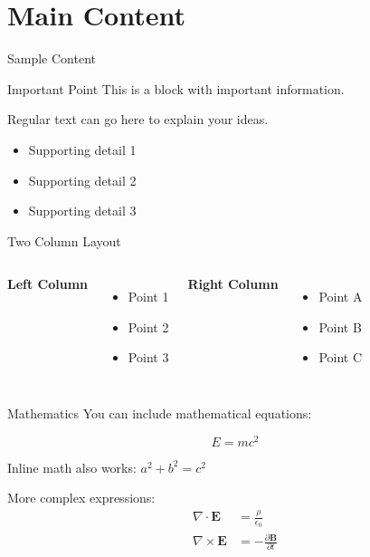 
\section{Main Content}

\begin{frame}{Sample Content}
    \begin{block}{Important Point}
        This is a block with important information.
    \end{block}

    \vspace{1em}

    Regular text can go here to explain your ideas.

    \begin{itemize}
        \item Supporting detail 1
        \item Supporting detail 2
        \item Supporting detail 3
    \end{itemize}
\end{frame}

\begin{frame}{Two Column Layout}
    \begin{columns}
        \textbf{Left Column}
        \begin{itemize}
            \item Point 1
            \item Point 2
            \item Point 3
        \end{itemize}

        \textbf{Right Column}
        \begin{itemize}
            \item Point A
            \item Point B
            \item Point C
        \end{itemize}
    \end{columns}
\end{frame}

\begin{frame}{Mathematics}
    You can include mathematical equations:

    \begin{equation}
        E = mc^2
    \end{equation}

    \vspace{1em}

    Inline math also works: $a^2 + b^2 = c^2$

    \vspace{1em}

    More complex expressions:
    \begin{align}
        \nabla \cdot \mathbf{E} &= \frac{\rho}{\epsilon_0} \\
        \nabla \times \mathbf{E} &= -\frac{\partial \mathbf{B}}{\partial t}
    \end{align}
\end{frame}

